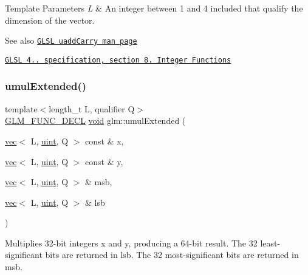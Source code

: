 \begin{DoxyTemplParams}{Template Parameters}
{\em L} & An integer between 1 and 4 included that qualify the dimension of the vector.\\
\hline
\end{DoxyTemplParams}
\begin{DoxySeeAlso}{See also}
\href{http://www.opengl.org/sdk/docs/manglsl/xhtml/uaddCarry.xml}{\tt G\+L\+SL uadd\+Carry man page} 

\href{http://www.opengl.org/registry/doc/GLSLangSpec.4.20.8.pdf}{\tt G\+L\+SL 4.. specification, section 8. Integer Functions} 
\end{DoxySeeAlso}
\mbox{\label{group__core__func__integer_ga732e2fb56db57ea541c7e5c92b7121be}} 
\subsubsection{\texorpdfstring{umul\+Extended()}{umulExtended()}}
{\footnotesize\ttfamily template$<$length\+\_\+t L, qualifier Q$>$ \\
\hyperlink{setup_8hpp_ab2d052de21a70539923e9bcbf6e83a51}{G\+L\+M\+\_\+\+F\+U\+N\+C\+\_\+\+D\+E\+CL} \hyperlink{_s_d_l__opengles2__gl2ext_8h_ae5d8fa23ad07c48bb609509eae494c95}{void} glm\+::umul\+Extended (\begin{DoxyParamCaption}\item[{\hyperlink{structglm_1_1vec}{vec}$<$ L, \hyperlink{group__core__precision_ga4fd29415871152bfb5abd588334147c8}{uint}, Q $>$ const \&}]{x,  }\item[{\hyperlink{structglm_1_1vec}{vec}$<$ L, \hyperlink{group__core__precision_ga4fd29415871152bfb5abd588334147c8}{uint}, Q $>$ const \&}]{y,  }\item[{\hyperlink{structglm_1_1vec}{vec}$<$ L, \hyperlink{group__core__precision_ga4fd29415871152bfb5abd588334147c8}{uint}, Q $>$ \&}]{msb,  }\item[{\hyperlink{structglm_1_1vec}{vec}$<$ L, \hyperlink{group__core__precision_ga4fd29415871152bfb5abd588334147c8}{uint}, Q $>$ \&}]{lsb }\end{DoxyParamCaption})}

Multiplies 32-\/bit integers x and y, producing a 64-\/bit result. The 32 least-\/significant bits are returned in lsb. The 32 most-\/significant bits are returned in msb.


